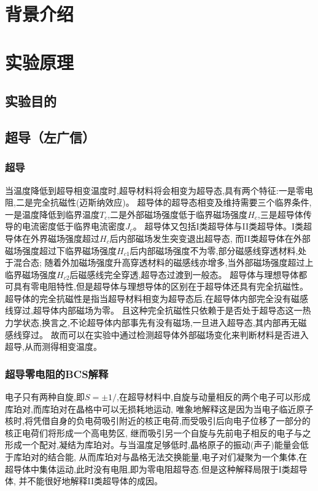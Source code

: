 \documentclass{spaexp}
\begin{document}
    \maketitle
    
    \section{背景介绍}
    \section{实验原理}
        \subsection{实验目的}
        \subsection{超导（左广信）}
            \subsubsection{超导}
                当温度降低到超导相变温度时,超导材料将会相变为超导态,具有两个特征:一是零电阻,二是完全抗磁性(迈斯纳效应)。
                超导体的超导态相变及维持需要三个临界条件,一是温度降低到临界温度$T_c$,二是外部磁场强度低于临界磁场强度$H_c$,三是超导体传导的电流密度低于临界电流密度$J_c$。
                超导体又包括I类超导体与II类超导体。I类超导体在外界磁场强度超过$H_c$后内部磁场发生突变退出超导态,
                而II类超导体在外部磁场强度超过下临界磁场强度$H_{c1}$后内部磁场强度不为零,部分磁感线穿透材料,处于混合态;
                随着外加磁场强度升高穿透材料的磁感线亦增多,当外部磁场强度超过上临界磁场强度$H_{c2}$后磁感线完全穿透,超导态过渡到一般态。
                超导体与理想导体都可具有零电阻特性,但是超导体与理想导体的区别在于超导体还具有完全抗磁性。
                超导体的完全抗磁性是指当超导材料相变为超导态后,在超导体内部完全没有磁感线穿过,超导体内部磁场为零。
                且这种完全抗磁性只依赖于是否处于超导态这一热力学状态,换言之,不论超导体内部事先有没有磁场,一旦进入超导态,其内部再无磁感线穿过。
                故而可以在实验中通过检测超导体外部磁场变化来判断材料是否进入超导,从而测得相变温度。
            \subsubsection{超导零电阻的BCS解释}
                电子只有两种自旋,即$S= \pm 1/$,在超导材料中,自旋与动量相反的两个电子可以形成库珀对,而库珀对在晶格中可以无损耗地运动,
                唯象地解释这是因为当电子临近原子核时,将凭借自身的负电荷吸引附近的核正电荷,而受吸引后向电子位移了一部分的核正电荷们将形成一个高电势区,
                继而吸引另一个自旋与先前电子相反的电子与之形成一个配对,凝结为库珀对。与当温度足够低时,晶格原子的振动(声子)能量会低于库珀对的结合能,
                从而库珀对与晶格无法交换能量,电子对们凝聚为一个集体,在超导体中集体运动,此时没有电阻,即为零电阻超导态.但是这种解释局限于I类超导体,
                并不能很好地解释II类超导体的成因。
\end{document}
